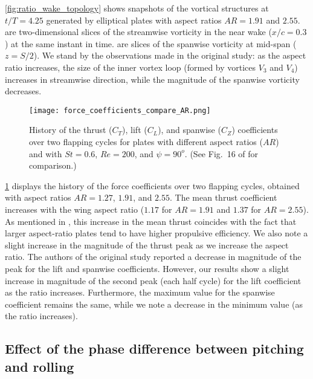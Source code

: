 \cref{fig:ratio_wake_topology} shows snapshots of the vortical structures at $t/T = 4.25$ generated by elliptical plates with aspect ratios $AR = 1.91$ and $2.55$.
 are two-dimensional slices of the streamwise vorticity in the near wake ($x/c = 0.3$) at the same instant in time.
 are slices of the spanwise vorticity at mid-span ($z = S/2$).
We stand by the observations made in the original study: as the aspect ratio increases, the size of the inner vortex loop (formed by vortices $V_3$ and $V_4$) increases in streamwise direction, while the magnitude of the spanwise vorticity decreases.

\begin{figure}[!h]
  \centering
  \texttt{[image: force\_coefficients\_compare\_AR.png]}
  \caption{History of the thrust ($C_T$), lift ($C_L$), and spanwise ($C_Z$) coefficients over two flapping cycles for plates with different aspect ratios ($AR$) and with $St = 0.6$, $Re = 200$, and $\psi = 90^o$. (See Fig.~16 of \citet{li_dong_2016} for comparison.)}
  \label{fig:ratio_force_coefficients}
\end{figure}

\cref{fig:ratio_force_coefficients} displays the history of the force coefficients over two flapping cycles, obtained with aspect ratios $AR = 1.27$, $1.91$, and $2.55$.
The mean thrust coefficient increases with the wing aspect ratio ($1.17$ for $AR = 1.91$ and $1.37$ for $AR = 2.55$).
As mentioned in \citet{li_dong_2016}, this increase in the mean thrust coincides with the fact that larger aspect-ratio plates tend to have higher propulsive efficiency.
We also note a slight increase in the magnitude of the thrust peak as we increase the aspect ratio.
The authors of the original study reported a decrease in magnitude of the peak for the lift and spanwise coefficients.
However, our results show a slight increase in magnitude of the second peak (each half cycle) for the lift coefficient as the ratio increases.
Furthermore, the maximum value for the spanwise coefficient remains the same, while we note a decrease in the minimum value (as the ratio increases).

\subsection{Effect of the phase difference between pitching and rolling}

